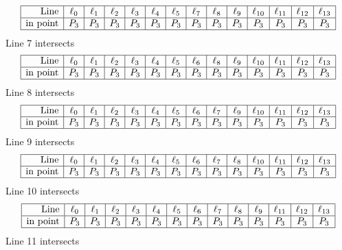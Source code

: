 \documentclass{article}
\begin{document}
{$$\begin{array}{|r*{13}{|c}|}
\hline
\mbox{Line}  & \ell_{0} & \ell_{1} & \ell_{2} & \ell_{3} & \ell_{4} & \ell_{5} & \ell_{7} & \ell_{8} & \ell_{9} & \ell_{10} & \ell_{11} & \ell_{12} & \ell_{13}\\
\hline
\mbox{in point}  & P_{3} & P_{3} & P_{3} & P_{3} & P_{3} & P_{3} & P_{3} & P_{3} & P_{3} & P_{3} & P_{3} & P_{3} & P_{3}\\
\hline
\end{array}
$$
Line 7 intersects 
$$
\begin{array}{|r*{13}{|c}|}
\hline
\mbox{Line}  & \ell_{0} & \ell_{1} & \ell_{2} & \ell_{3} & \ell_{4} & \ell_{5} & \ell_{6} & \ell_{8} & \ell_{9} & \ell_{10} & \ell_{11} & \ell_{12} & \ell_{13}\\
\hline
\mbox{in point}  & P_{3} & P_{3} & P_{3} & P_{3} & P_{3} & P_{3} & P_{3} & P_{3} & P_{3} & P_{3} & P_{3} & P_{3} & P_{3}\\
\hline
\end{array}
$$
Line 8 intersects 
$$
\begin{array}{|r*{13}{|c}|}
\hline
\mbox{Line}  & \ell_{0} & \ell_{1} & \ell_{2} & \ell_{3} & \ell_{4} & \ell_{5} & \ell_{6} & \ell_{7} & \ell_{9} & \ell_{10} & \ell_{11} & \ell_{12} & \ell_{13}\\
\hline
\mbox{in point}  & P_{3} & P_{3} & P_{3} & P_{3} & P_{3} & P_{3} & P_{3} & P_{3} & P_{3} & P_{3} & P_{3} & P_{3} & P_{3}\\
\hline
\end{array}
$$
Line 9 intersects 
$$
\begin{array}{|r*{13}{|c}|}
\hline
\mbox{Line}  & \ell_{0} & \ell_{1} & \ell_{2} & \ell_{3} & \ell_{4} & \ell_{5} & \ell_{6} & \ell_{7} & \ell_{8} & \ell_{10} & \ell_{11} & \ell_{12} & \ell_{13}\\
\hline
\mbox{in point}  & P_{3} & P_{3} & P_{3} & P_{3} & P_{3} & P_{3} & P_{3} & P_{3} & P_{3} & P_{3} & P_{3} & P_{3} & P_{3}\\
\hline
\end{array}
$$
Line 10 intersects 
$$
\begin{array}{|r*{13}{|c}|}
\hline
\mbox{Line}  & \ell_{0} & \ell_{1} & \ell_{2} & \ell_{3} & \ell_{4} & \ell_{5} & \ell_{6} & \ell_{7} & \ell_{8} & \ell_{9} & \ell_{11} & \ell_{12} & \ell_{13}\\
\hline
\mbox{in point}  & P_{3} & P_{3} & P_{3} & P_{3} & P_{3} & P_{3} & P_{3} & P_{3} & P_{3} & P_{3} & P_{3} & P_{3} & P_{3}\\
\hline
\end{array}
$$
Line 11 intersects 
$$
\begin{array}{|r*{13}{|c}|}

\end{array}$$}
\end{document}
